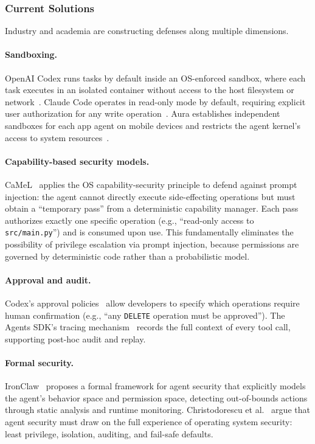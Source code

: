 \subsubsection{Current Solutions}
Industry and academia are constructing defenses along multiple dimensions.

\paragraph{Sandboxing.}
OpenAI Codex runs tasks by default inside an OS-enforced sandbox, where each task executes in an isolated container without access to the host filesystem or network~\cite{openai_codex_sandbox_2026}.
Claude Code operates in read-only mode by default, requiring explicit user authorization for any write operation~\cite{anthropic_claudecode_security_2026}.
Aura establishes independent sandboxes for each app agent on mobile devices and restricts the agent kernel's access to system resources~\cite{aura2025}.

\paragraph{Capability-based security models.}
CaMeL~\cite{debenedetti2025camel} applies the OS capability-security principle to defend against prompt injection: the agent cannot directly execute side-effecting operations but must obtain a ``temporary pass'' from a deterministic capability manager.
Each pass authorizes exactly one specific operation (e.g., ``read-only access to \texttt{src/main.py}'') and is consumed upon use.
This fundamentally eliminates the possibility of privilege escalation via prompt injection, because permissions are governed by deterministic code rather than a probabilistic model.

\paragraph{Approval and audit.}
Codex's approval policies~\cite{openai_codex_approvals_2026} allow developers to specify which operations require human confirmation (e.g., ``any \texttt{DELETE} operation must be approved'').
The Agents SDK's tracing mechanism~\cite{openai_codex_agentsdk_2026} records the full context of every tool call, supporting post-hoc audit and replay.

\paragraph{Formal security.}
IronClaw~\cite{ironclaw2025} proposes a formal framework for agent security that explicitly models the agent's behavior space and permission space, detecting out-of-bounds actions through static analysis and runtime monitoring.
Christodorescu et al.~\cite{agenticsecurity2025} argue that agent security must draw on the full experience of operating system security: least privilege, isolation, auditing, and fail-safe defaults.

